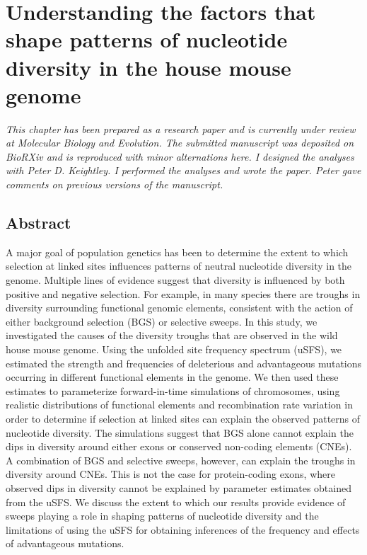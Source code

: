 \chapter{Understanding the factors that shape patterns of nucleotide diversity in the house mouse genome}

\emph{This chapter has been prepared as a research paper and is currently under review at Molecular Biology and Evolution. The submitted manuscript was deposited on \textit{BioRXiv} and is reproduced with minor alternations here. I designed the analyses with Peter D. Keightley. I performed the analyses and wrote the paper. Peter gave comments on previous versions of the manuscript.}

\section{Abstract}
	A major goal of population genetics has been to determine the extent to which selection at linked sites influences patterns of neutral nucleotide diversity in the genome. Multiple lines of evidence suggest that diversity is influenced by both positive and negative selection. For example, in many species there are troughs in diversity surrounding functional genomic elements, consistent with the action of either background selection (BGS) or selective sweeps. In this study, we investigated the causes of the diversity troughs that are observed in the wild house mouse genome. Using the unfolded site frequency spectrum (uSFS), we estimated the strength and frequencies of deleterious and advantageous mutations occurring in different functional elements in the genome. We then used these estimates to parameterize forward-in-time simulations of chromosomes, using realistic distributions of functional elements and recombination rate variation in order to determine if selection at linked sites can explain the observed patterns of nucleotide diversity. The simulations suggest that BGS alone cannot explain the dips in diversity around either exons or conserved non-coding elements (CNEs). A combination of BGS and selective sweeps, however, can explain the troughs in diversity around CNEs. This is not the case for protein-coding exons, where observed dips in diversity cannot be explained by parameter estimates obtained from the uSFS. We discuss the extent to which our results provide evidence of sweeps playing a role in shaping patterns of nucleotide diversity and the limitations of using the uSFS for obtaining inferences of the frequency and effects of advantageous mutations.


